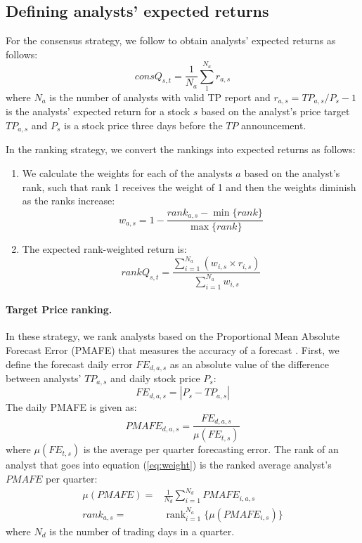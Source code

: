 \documentclass{article}\usepackage[]{graphicx}\usepackage[]{color}
\DeclareMathOperator{\rank}{rank}
\begin{document}
\subsection{Defining analysts' expected returns}
\label{def-q}

For the consensus strategy, we follow \cite{da2011bl} to obtain analysts' expected returns as follows:
\begin{equation}
\label{consq}
consQ_{s,t}= \frac{1}{N_a} \sum_1^{N_a} r_{a,s}
\end{equation}
where $N_a$ is the number of analysts with valid TP report and $r_{a,s}=TP_{a,s}/P_{s}-1$  is the analysts' expected return for a stock $s$ based on the analyst's price target $TP_{a,s}$ and $P_{s}$ is a stock price three days before the $TP$ announcement.

In the ranking strategy, we convert the rankings into expected returns as follows:

\begin{enumerate}
\item We calculate the weights for each of the analysts $a$ based on the analyst's rank, such that rank 1 receives the weight of 1 and then the weights diminish as the ranks increase:
\begin{equation}
\label{eq:weight}
w_{a,s}=1-\frac{rank_{a,s}-\min{ \{rank \} }}{\max{\{rank \}}}
\end{equation}

\item The expected rank-weighted return is:
\begin{equation}
\label{rankq}
rankQ_{s,t}=\frac{\sum_{i=1}^{N_a} (w_{i,s} \times r_{i,s})}{\sum_{i=1}^{N_a} w_{i,s}}
\end{equation}
\end{enumerate}


\paragraph{Target Price ranking.} In these strategy, we rank analysts based on the Proportional  Mean Absolute Forecast Error (PMAFE) that measures the accuracy of a forecast  \citep{clement1999,brown2001,ertimur2007}. First,  we define the forecast daily error  $FE_{d,a,s}$ as an absolute value of the difference between analysts' $TP_{a,s}$ and daily stock price $P_{s}$:
\begin{equation}
\label{dfe}
FE_{d,a,s}=|{P_{s}-TP_{a,s}}|
\end{equation}
The daily PMAFE is given as:
\begin{equation}
\label{tp:pmafe}
PMAFE_{d,a,s}=\frac{FE_{d,a,s}}{\mu(FE_{t,s})}
\end{equation}
where $\mu({FE}_{t,s})$ is the average per quarter forecasting error.
The rank of an analyst that goes into equation (\ref{eq:weight}) is the ranked average analyst's $PMAFE$ per quarter:
\begin{eqnarray}
\label{tp:rank}
\mu(PMAFE)=&\frac{1}{N_d} \sum_{i=1}^{N_d} PMAFE_{i,a,s} \\
rank_{a,s}=&\rank_{i=1}^{N_a} \{ \mu(PMAFE_{i,s}) \}
\end{eqnarray}
where $N_d$ is the number of trading days in a quarter.
\end{document}
